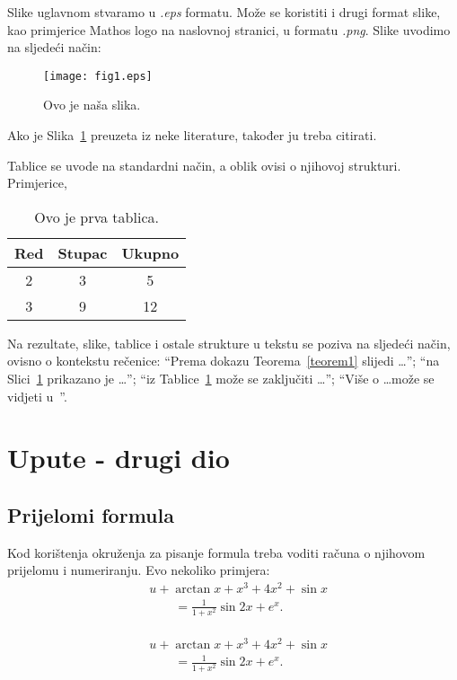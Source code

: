 \documentclass{mathos}
\begin{document}
Slike uglavnom stvaramo u {\it .eps} formatu. Može se koristiti i drugi format slike, kao primjerice  Mathos logo na naslovnoj stranici, u formatu {\it .png}. Slike uvodimo na sljedeći način:

\begin{figure}[h!]
\centering
\texttt{[image: fig1.eps]}
\caption{Ovo je naša slika.}
\label{fig1}
\end{figure}

Ako je Slika~\ref{fig1} preuzeta iz neke literature, također ju treba citirati.

\newpage
Tablice se uvode na standardni način, a oblik ovisi o njihovoj strukturi. Primjerice,

\begin{table}[hbtp]
\centering
\begin{tabular}{|c|c|c|}\hline
Red & Stupac& Ukupno\\\hline
2 & 3 & 5\\\hline
3 & 9 & 12\\\hline
\end{tabular}
\caption{Ovo je prva tablica.}
\label{table1}
\end{table}

\noindent
Na rezultate, slike, tablice i ostale strukture u tekstu se poziva na sljedeći način, ovisno o kontekstu rečenice: ``Prema dokazu Teorema~\ref{teorem1} slijedi \dots''; ``na
Slici~\ref{fig1} prikazano je \dots''; ``iz Tablice~\ref{table1} može se zaključiti \dots''; ``Više o \dots može se vidjeti u~\cite{JunBae}''.



\chapter{Upute - drugi dio}\label{poglavlje_2}

\section{Prijelomi formula}
Kod korištenja okruženja za pisanje formula treba voditi računa o njihovom prijelomu i numeriranju. Evo nekoliko primjera:
\begin{align*}
    &u+\arctan x +x^3+4x^2+\sin{x}  \\
    &\qquad =\frac{1}{1 + x^2} \sin{2x}+e^x.
\end{align*}

\begin{eqnarray}\label{eq_1}
\begin{aligned}
    &u+\arctan x +x^3+4x^2+\sin{x}  \\
    &\qquad =\frac{1}{1 + x^2} \sin{2x}+e^x.
\end{aligned}
\end{eqnarray}
\end{document}
